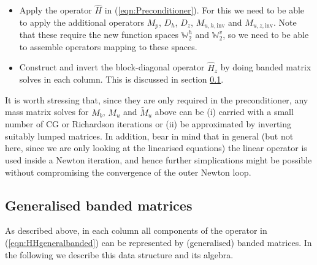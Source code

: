 \documentclass[10pt]{article}
\newcommand{\Wspace}{\mathbb{W}}
\begin{document}
\begin{itemize}
\begin{itemize}
\begin{itemize}
      \item Apply the operator $\hat{H}$ in (\ref{eqn:Preconditioner}). For this we need to be able to apply the additional operators $M_p$, $D_h$, $D_z$, $M_{u,h,\text{inv}}$ and $M_{u,z,\text{inv}}$. Note that these require the new function spaces $\Wspace_2^h$ and $\Wspace_2^v$, so we need to be able to assemble operators mapping to these spaces.
      \item Construct and invert the block-diagonal operator $\hat{H}_z$ by doing banded matrix solves in each column. This is discussed in section \ref{sec:BandedMatrices}.
    \end{itemize}
  \end{itemize}
\end{itemize}

It is worth stressing that, since they are only required in the preconditioner, any mass matrix solves for $M_b$, $M_u$ and $\tilde{M}_u$ above can be (i) carried with a small number of CG or Richardson iterations or (ii) be approximated by inverting suitably lumped matrices. In addition, bear in mind that in general (but not here, since we are only looking at the linearised equations) the linear operator is used inside a Newton iteration, and hence further simplications might be possible without compromising the convergence of the outer Newton loop.
\subsection{Generalised banded matrices}\label{sec:BandedMatrices}
As described above, in each column all components of the operator in (\ref{eqn:HHgeneralbanded}) can be represented by (generalised) banded matrices. In the following we describe this data structure and its algebra.
\end{document}
